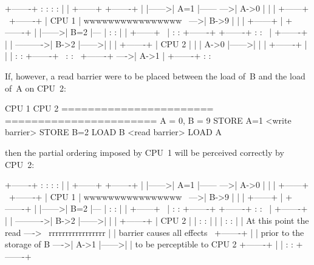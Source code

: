   \begin{VerbatimU}
	+-------+       :      :                :       :
	|       |       +------+                +-------+
	|       |------>| A=1  |------      --->| A->0  |
	|       |       +------+      \         +-------+
	| CPU 1 |   wwwwwwwwwwwwwwww   \    --->| B->9  |
	|       |       +------+        |       +-------+
	|       |------>| B=2  |---     |       :       :
	|       |       +------+   \    |       :       :       +-------+
	+-------+       :      :    \   |       +-------+       |       |
	                             ---------->| B->2  |------>|       |
	                                |       +-------+       | CPU 2 |
	                                |       | A->0  |------>|       |
	                                |       +-------+       |       |
	                                |       :       :       +-------+
	                                 \      :       :
	                                  \     +-------+
	                                   ---->| A->1  |
	                                        +-------+
	                                        :       :
\end{VerbatimU}

If, however, a read barrier were to be placed between the load of~B and the
load of~A on CPU~2:

\begin{VerbatimU}
	CPU 1                   CPU 2
	=======================	=======================
		{ A = 0, B = 9 }
	STORE A=1
	<write barrier>
	STORE B=2
	                        LOAD B
	                        <read barrier>
	                        LOAD A
\end{VerbatimU}

then the partial ordering imposed by CPU~1 will be perceived correctly by
CPU~2:

\begin{VerbatimU}
	+-------+       :      :                :       :
	|       |       +------+                +-------+
	|       |------>| A=1  |------      --->| A->0  |
	|       |       +------+      \         +-------+
	| CPU 1 |   wwwwwwwwwwwwwwww   \    --->| B->9  |
	|       |       +------+        |       +-------+
	|       |------>| B=2  |---     |       :       :
	|       |       +------+   \    |       :       :       +-------+
	+-------+       :      :    \   |       +-------+       |       |
	                             ---------->| B->2  |------>|       |
	                                |       +-------+       | CPU 2 |
	                                |       :       :       |       |
	                                |       :       :       |       |
	  At this point the read ---->   \  rrrrrrrrrrrrrrrrr   |       |
	  barrier causes all effects      \     +-------+       |       |
	  prior to the storage of B        ---->| A->1  |------>|       |
	  to be perceptible to CPU 2            +-------+       |       |
	                                        :       :       +-------+
\end{VerbatimU}

